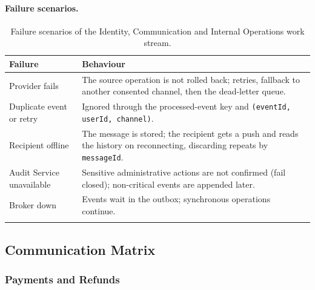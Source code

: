 \paragraph{Failure scenarios.}
\begin{longtable}{@{}L{4.6cm}L{9.2cm}@{}}
\toprule
\textbf{Failure} & \textbf{Behaviour} \\
\midrule
\endhead
Provider fails & The source operation is not rolled back; retries, fallback
  to another consented channel, then the dead-letter queue. \\
Duplicate event or retry & Ignored through the processed-event key and
  \texttt{(eventId, userId, channel)}. \\
Recipient offline & The message is stored; the recipient gets a push and reads
  the history on reconnecting, discarding repeats by \texttt{messageId}. \\
Audit Service unavailable & Sensitive administrative actions are not
  confirmed (fail closed); non-critical events are appended later. \\
Broker down & Events wait in the outbox; synchronous operations continue. \\
\bottomrule
\caption{Failure scenarios of the Identity, Communication and Internal
Operations work stream.}
\label{tab:id-failures}
\end{longtable}
\endgroup

\subsection{Communication Matrix}

\begingroup
\setlength{\emergencystretch}{3em}
\subsubsection{Payments and Refunds}
\label{sec:pay-matrix}

